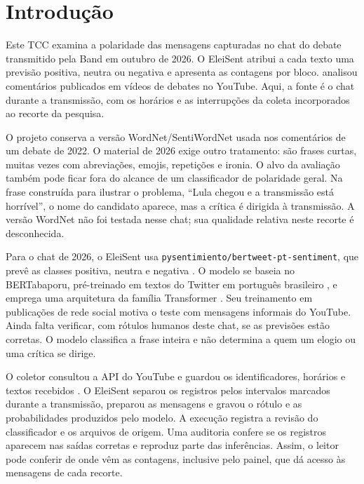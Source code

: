 
\chapter{Introdução}

Este TCC examina a polaridade das mensagens capturadas no chat do debate transmitido pela Band em outubro de 2026. O EleiSent atribui a cada texto uma previsão positiva, neutra ou negativa e apresenta as contagens por bloco.  analisou comentários publicados em vídeos de debates no YouTube. Aqui, a fonte é o chat durante a transmissão, com os horários e as interrupções da coleta incorporados ao recorte da pesquisa.

O projeto conserva a versão WordNet/SentiWordNet usada nos comentários de um debate de 2022. O material de 2026 exige outro tratamento: são frases curtas, muitas vezes com abreviações, emojis, repetições e ironia. O alvo da avaliação também pode ficar fora do alcance de um classificador de polaridade geral. Na frase construída para ilustrar o problema, ``Lula chegou e a transmissão está horrível'', o nome do candidato aparece, mas a crítica é dirigida à transmissão. A versão WordNet não foi testada nesse chat; sua qualidade relativa neste recorte é desconhecida.

Para o chat de 2026, o EleiSent usa \texttt{pysentimiento/bertweet-pt-sentiment}, que prevê as classes positiva, neutra e negativa \cite{PysentimientoBertweetPT}. O modelo se baseia no BERTabaporu, pré-treinado em textos do Twitter em português brasileiro \cite{Costa2023}, e emprega uma arquitetura da família Transformer \cite{Vaswani2017}. Seu treinamento em publicações de rede social motiva o teste com mensagens informais do YouTube. Ainda falta verificar, com rótulos humanos deste chat, se as previsões estão corretas. O modelo classifica a frase inteira e não determina a quem um elogio ou uma crítica se dirige.

O coletor consultou a API do YouTube e guardou os identificadores, horários e textos recebidos \cite{YouTubeLiveChatMessages}. O EleiSent separou os registros pelos intervalos marcados durante a transmissão, preparou as mensagens e gravou o rótulo e as probabilidades produzidos pelo modelo. A execução registra a revisão do classificador e os arquivos de origem. Uma auditoria confere se os registros aparecem nas saídas corretas e reproduz parte das inferências. Assim, o leitor pode conferir de onde vêm as contagens, inclusive pelo painel, que dá acesso às mensagens de cada recorte.

